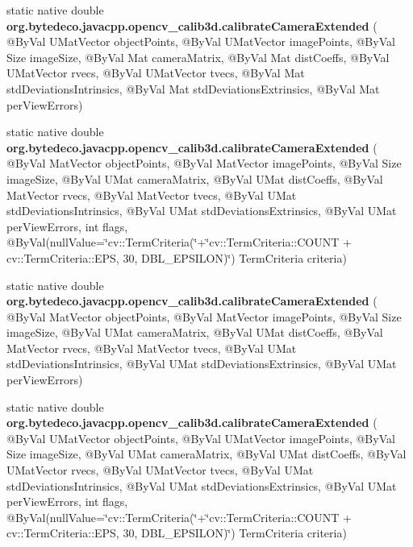 \begin{DoxyCompactItemize}
static native double {\bfseries org.\+bytedeco.\+javacpp.\+opencv\+\_\+calib3d.\+calibrate\+Camera\+Extended} ( @By\+Val U\+Mat\+Vector object\+Points, @By\+Val U\+Mat\+Vector image\+Points, @By\+Val Size image\+Size, @By\+Val Mat camera\+Matrix, @By\+Val Mat dist\+Coeffs, @By\+Val U\+Mat\+Vector rvecs, @By\+Val U\+Mat\+Vector tvecs, @By\+Val Mat std\+Deviations\+Intrinsics, @By\+Val Mat std\+Deviations\+Extrinsics, @By\+Val Mat per\+View\+Errors)
\item 
\mbox{\label{group__calib3d_ga2541b0ee995840525cc2be41c7bbd6a5}} 
static native double {\bfseries org.\+bytedeco.\+javacpp.\+opencv\+\_\+calib3d.\+calibrate\+Camera\+Extended} ( @By\+Val Mat\+Vector object\+Points, @By\+Val Mat\+Vector image\+Points, @By\+Val Size image\+Size, @By\+Val U\+Mat camera\+Matrix, @By\+Val U\+Mat dist\+Coeffs, @By\+Val Mat\+Vector rvecs, @By\+Val Mat\+Vector tvecs, @By\+Val U\+Mat std\+Deviations\+Intrinsics, @By\+Val U\+Mat std\+Deviations\+Extrinsics, @By\+Val U\+Mat per\+View\+Errors, int flags, @By\+Val(null\+Value=\char`\"{}cv\+::\+Term\+Criteria(\char`\"{}+\char`\"{}cv\+::\+Term\+Criteria\+::\+C\+O\+U\+NT + cv\+::\+Term\+Criteria\+::\+E\+PS, 30, D\+B\+L\+\_\+\+E\+P\+S\+I\+L\+ON)\char`\"{}) Term\+Criteria criteria)
\item 
\mbox{\label{group__calib3d_ga085e73b96549a7b9c7b50a05bde53832}} 
static native double {\bfseries org.\+bytedeco.\+javacpp.\+opencv\+\_\+calib3d.\+calibrate\+Camera\+Extended} ( @By\+Val Mat\+Vector object\+Points, @By\+Val Mat\+Vector image\+Points, @By\+Val Size image\+Size, @By\+Val U\+Mat camera\+Matrix, @By\+Val U\+Mat dist\+Coeffs, @By\+Val Mat\+Vector rvecs, @By\+Val Mat\+Vector tvecs, @By\+Val U\+Mat std\+Deviations\+Intrinsics, @By\+Val U\+Mat std\+Deviations\+Extrinsics, @By\+Val U\+Mat per\+View\+Errors)
\item 
\mbox{\label{group__calib3d_gab36683e1d5ff4e69e8a50699dbd3afae}} 
static native double {\bfseries org.\+bytedeco.\+javacpp.\+opencv\+\_\+calib3d.\+calibrate\+Camera\+Extended} ( @By\+Val U\+Mat\+Vector object\+Points, @By\+Val U\+Mat\+Vector image\+Points, @By\+Val Size image\+Size, @By\+Val U\+Mat camera\+Matrix, @By\+Val U\+Mat dist\+Coeffs, @By\+Val U\+Mat\+Vector rvecs, @By\+Val U\+Mat\+Vector tvecs, @By\+Val U\+Mat std\+Deviations\+Intrinsics, @By\+Val U\+Mat std\+Deviations\+Extrinsics, @By\+Val U\+Mat per\+View\+Errors, int flags, @By\+Val(null\+Value=\char`\"{}cv\+::\+Term\+Criteria(\char`\"{}+\char`\"{}cv\+::\+Term\+Criteria\+::\+C\+O\+U\+NT + cv\+::\+Term\+Criteria\+::\+E\+PS, 30, D\+B\+L\+\_\+\+E\+P\+S\+I\+L\+ON)\char`\"{}) Term\+Criteria criteria)

\end{DoxyCompactItemize}
